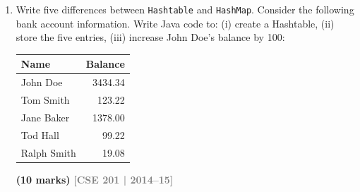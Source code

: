 \documentclass[12pt,a3paper]{article}
\newcommand{\yr}[1]{\hfill\textcolor{gray}{\small\textbf{[#1]}}}
\newcommand{\mk}[1]{\textcolor{orange!70!black}{\small\textbf{(#1 marks)}}}
\begin{document}
\begin{enumerate}
\begin{tcolorbox}[enhanced,breakable,ansbox,
  colback=cG!4,colframe=cG,boxrule=0.8pt,arc=5pt,
  title={\textbf{Answer --- Student Collection Sorted by CGPA, Age, Name}},
  fonttitle=\bfseries\color{white},colbacktitle=cG]
\begin{lstlisting}[language=Java]
import java.util.*;

class Student implements Comparable<Student> {
    String name; int age; double cgpa;

    Student(String name, int age, double cgpa) {
        this.name=name; this.age=age; this.cgpa=cgpa;
    }

    @Override
    public int compareTo(Student o) {
        int c = Double.compare(o.cgpa, this.cgpa); // desc CGPA
        if (c != 0) return c;
        c = Integer.compare(this.age, o.age);       // asc age
        if (c != 0) return c;
        return this.name.compareTo(o.name);         // lex name
    }

    @Override
    public String toString() {
        return name + "(age=" + age + ",cgpa=" + cgpa + ")";
    }
}

class StudentCollectionSort {
    public static void main(String[] args) {
        ArrayList<Student> list = new ArrayList<>();
        list.add(new Student("Alice", 21, 3.8));
        list.add(new Student("Bob",   20, 3.9));
        list.add(new Student("Carol", 22, 3.8));
        list.add(new Student("Dave",  21, 3.8));
        list.add(new Student("Eve",   19, 4.0));

        Collections.sort(list);
        list.forEach(System.out::println);
    }
}
\end{lstlisting}
\textbf{Output:}
\begin{verbatim}
Eve(age=19,cgpa=4.0)
Bob(age=20,cgpa=3.9)
Alice(age=21,cgpa=3.8)
Dave(age=21,cgpa=3.8)
Carol(age=22,cgpa=3.8)
\end{verbatim}
\end{tcolorbox}



\item Write five differences between \texttt{Hashtable} and \texttt{HashMap}. Consider the following bank account information. Write Java code to: (i) create a Hashtable, (ii) store the five entries, (iii) increase John Doe's balance by 100:
\begin{center}
\begin{tabular}{lr} \toprule \textbf{Name} & \textbf{Balance} \\ \midrule John Doe & 3434.34 \\ Tom Smith & 123.22 \\ Jane Baker & 1378.00 \\ Tod Hall & 99.22 \\ Ralph Smith & 19.08 \\ \bottomrule \end{tabular}
\end{center}
\mk{10}
\yr{CSE 201 | 2014--15}


\end{enumerate}
\end{document}
